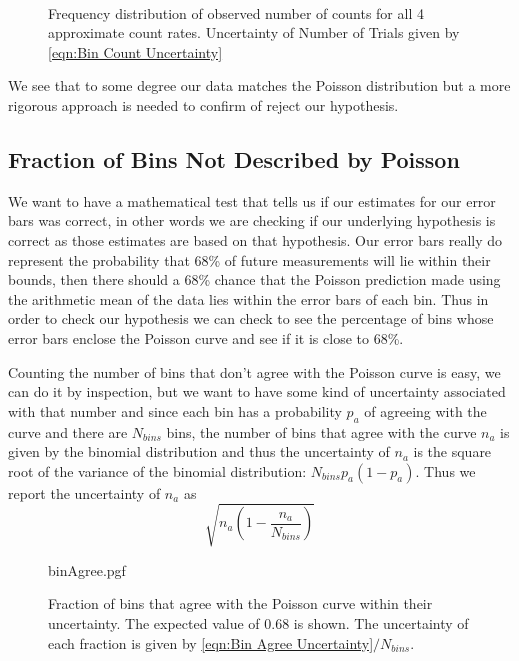 \documentclass[12pt]{article}
\numberwithin{equation}{section}
\numberwithin{figure}{section}
\numberwithin{table}{section}
\begin{document}
\begin{figure}[H]%
    \centering
    \,
    \,
    \,
    \caption{Frequency distribution of observed number of counts for all 4 approximate count rates. Uncertainty of Number of Trials given by \autoref{eqn:Bin Count Uncertainty}}
    \label{fig:Poisson Plots}
\end{figure}
\par We see that to some degree our data matches the Poisson distribution but a more rigorous approach is needed to confirm of reject our hypothesis. 

\subsection{Fraction of Bins Not Described by Poisson}\label{sec:Poisson Bins}
We want to have a mathematical test that tells us if our estimates for our error bars was correct, in other words we are checking if our underlying hypothesis is correct as those estimates are based on that hypothesis. Our error bars really do represent the probability that 68\% of future measurements will lie within their bounds, then there should a 68\% chance that the Poisson prediction made using the arithmetic mean of the data lies within the error bars of each bin. Thus in order to check our hypothesis we can check to see the percentage of bins whose error bars enclose the Poisson curve and see if it is close to 68\%. 
\par Counting the number of bins that don't agree with the Poisson curve is easy, we can do it by inspection, but we want to have some kind of uncertainty associated with that number and since each bin has a probability $p_a$ of agreeing with the curve and there are $N_{bins}$ bins, the number of bins that agree with the curve $n_a$ is given by the binomial distribution and thus the uncertainty of $n_a$ is the square root of the variance of the binomial distribution: $N_{bins}p_a(1-p_a)$. Thus we report the uncertainty of $n_a$ as 
\begin{equation}
    \sqrt{n_a\left(1-\frac{n_a}{N_{bins}}\right)}
    \label{eqn:Bin Agree Uncertainty}
\end{equation}

\begin{figure}[H]
    \begin{center}
       {binAgree.pgf}
       \caption{Fraction of bins that agree with the Poisson curve within their uncertainty. The expected value of 0.68 is shown. The uncertainty of each fraction is given by \autoref{eqn:Bin Agree Uncertainty}$/N_{bins}$.}
       \label{fig:Bin Agree}
    \end{center}
\end{figure}
\end{document}
